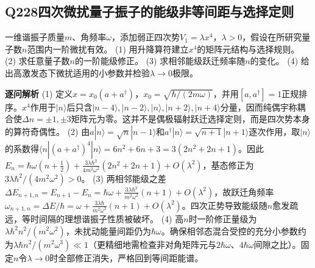\subsection*{Q228\quad 四次微扰量子振子的能级非等间距与选择定则}
一维谐振子质量$m$、角频率$\omega$，添加弱正四次势$V_1=\lambda x^4$，$\lambda>0$，假设在所研究量子数$n$范围内一阶微扰有效。
(1) 用升降算符建立$x^4$的矩阵元结构与选择规则。
(2) 求任意量子数$n$的一阶能级修正。
(3) 求相邻能级跃迁频率随$n$的变化。
(4) 给出高激发态下微扰适用的小参数并检验$\lambda\to0$极限。
\par\textbf{逐问解析}
(1) 定义$x=x_0(a+a^\dagger)$，$x_0=\sqrt{\hbar/(2m\omega)}$，并用$[a,a^\dagger]=1$正规排序。$x^4$作用于$|n\rangle$后只含$|n-4\rangle,|n-2\rangle,|n\rangle,|n+2\rangle,|n+4\rangle$分量，因而纯偶宇称耦合使$\Delta n=\pm1,\pm3$矩阵元为零。这并不是偶极辐射跃迁选择定则，而是四次势本身的算符奇偶性。
(2) 由$a|n\rangle=\sqrt n|n-1\rangle$和$a^\dagger|n\rangle=\sqrt{n+1}|n+1\rangle$逐次作用，取$|n\rangle$的系数得$\langle n|(a+a^\dagger)^4|n\rangle=6n^2+6n+3=3(2n^2+2n+1)$。因此$E_n=\hbar\omega(n+\tfrac12)+\frac{3\lambda\hbar^2}{4m^2\omega^2}(2n^2+2n+1)+O(\lambda^2)$，基态修正为$3\lambda\hbar^2/(4m^2\omega^2)>0$。
(3) 两相邻能级之差$\Delta E_{n+1,n}=E_{n+1}-E_n=\hbar\omega+\frac{3\lambda\hbar^2}{m^2\omega^2}(n+1)+O(\lambda^2)$，故跃迁角频率$\omega_{n+1,n}=\Delta E/\hbar=\omega+\frac{3\lambda\hbar}{m^2\omega^2}(n+1)+O(\lambda^2)$。四次正势导致能级随$n$愈发疏远，等时间隔的理想谐振子性质被破坏。
(4) 高$n$时一阶修正量级为$\lambda\hbar^2 n^2/(m^2\omega^2)$，未扰动能量间距仍为$\hbar\omega$。确保相邻态混合受控的充分小参数约为$\lambda\hbar n^2/(m^2\omega^3)\ll1$（更精细地需检查非对角矩阵元与$2\hbar\omega$、$4\hbar\omega$间隙之比）。固定$n$令$\lambda\to0$时全部修正消失，严格回到等间距能谱。
\par\medskip
